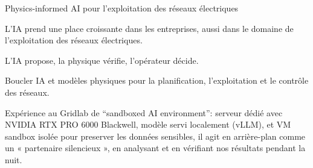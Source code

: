 \documentclass[aspectratio=169,10pt]{beamer}
\begin{document}
\begin{frame}{Physics-informed AI pour l'exploitation des réseaux électriques}

L'IA prend une place croissante dans les entreprises, aussi dans le domaine de l'exploitation des réseaux électriques.

\vfill

\begin{fitemize}
  \item L'IA propose, la physique vérifie, l'opérateur décide.
  \item Boucler IA et modèles physiques pour la planification, l’exploitation et le contrôle des réseaux.
  \item Expérience au Gridlab de ``sandboxed AI environment'': serveur dédié avec NVIDIA RTX PRO 6000 Blackwell, modèle servi localement (vLLM), et VM sandbox isolée pour preserver les données sensibles,  il agit en arrière-plan comme un « partenaire silencieux », en analysant et en vérifiant nos résultats pendant la nuit.
\end{fitemize}

{\bfseries\color{primary}}



  

\end{frame}
\end{document}
